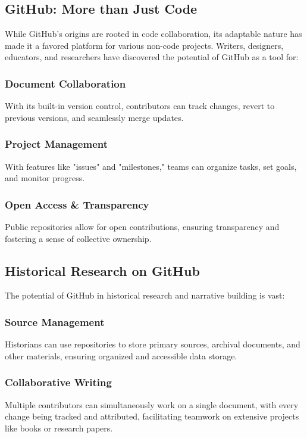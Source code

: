 \documentclass[a4paper,12pt]{book}
\begin{document}
\subsection*{GitHub: More than Just Code}
While GitHub's origins are rooted in code collaboration, its adaptable nature has made it a favored platform for various non-code projects. Writers, designers, educators, and researchers have discovered the potential of GitHub as a tool for:

\subsubsection*{Document Collaboration}
With its built-in version control, contributors can track changes, revert to previous versions, and seamlessly merge updates.

\subsubsection*{Project Management}
With features like "issues" and "milestones," teams can organize tasks, set goals, and monitor progress.

\subsubsection*{Open Access \& Transparency}
Public repositories allow for open contributions, ensuring transparency and fostering a sense of collective ownership.

\subsection*{Historical Research on GitHub}
The potential of GitHub in historical research and narrative building is vast:

\subsubsection*{Source Management}
Historians can use repositories to store primary sources, archival documents, and other materials, ensuring organized and accessible data storage.

\subsubsection*{Collaborative Writing}
Multiple contributors can simultaneously work on a single document, with every change being tracked and attributed, facilitating teamwork on extensive projects like books or research papers.
\end{document}
